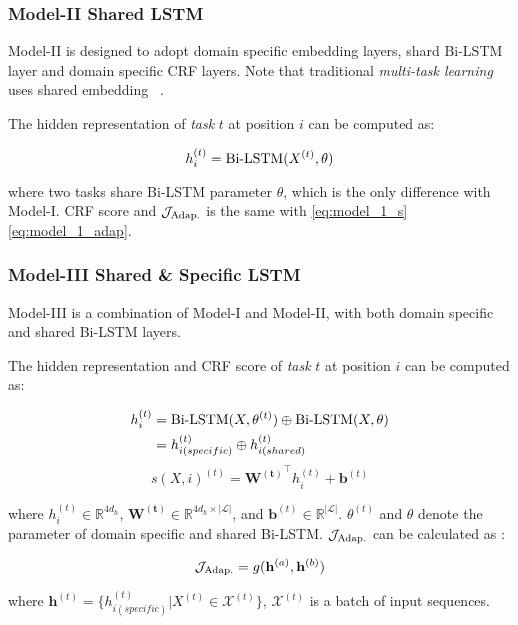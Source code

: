 \subsubsection{Model-\RN{2} Shared LSTM}

Model-\RN{2} is designed to adopt domain specific embedding layers, shard Bi-LSTM layer and domain specific CRF layers. Note that traditional \textit{multi-task learning} uses shared embedding ~\cite{DBLP:journals/corr/Ruder17a}.

The hidden representation of \textit{task} $t$ at position $i$ can be computed as:

\small
\begin{equation}\label{eq:model_2_h}
h_i^{(t)} = \textnormal{Bi-LSTM}(X^{(t)}, \theta)
\end{equation}
\normalsize

\noindent where two tasks share Bi-LSTM parameter $\theta$, which is the only difference with Model-\RN{1}. CRF score and $\mathcal{J}_{\textnormal{Adap.}}$ is the same with \eqref{eq:model_1_s}\eqref{eq:model_1_adap}.

\subsubsection{Model-\RN{3} Shared \& Specific LSTM}

Model-\RN{3} is a combination of Model-\RN{1} and Model-\RN{2}, with both domain specific and shared Bi-LSTM layers.

The hidden representation and CRF score of \textit{task} $t$ at position $i$ can be computed as:

\small
\begin{equation}
\begin{aligned}
h_i^{(t)} &= \textnormal{Bi-LSTM}(X, \theta^{(t)}) \oplus \textnormal{Bi-LSTM}(X, \theta)\\
&= h_{i(specific)}^{(t)} \oplus h_{i(shared)}^{(t)}
\end{aligned}
\end{equation}
\begin{equation}
s(X, i)^{(t)} = \mathbf{W^{(t)}}^\top h_i^{(t)} + \mathbf{b}^{(t)}
\end{equation}
\normalsize

\noindent where $h_i^{(t)} \in \mathbb{R}^{4d_h}$, $\mathbf{W^{(t)}} \in \mathbb{R}^{4d_h \times |\mathcal{L}|}$, and $\mathbf{b}^{(t)} \in \mathbb{R}^{|\mathcal{L}|}$. $\theta^{(t)}$ and $\theta$ denote the parameter of domain specific and shared Bi-LSTM. $\mathcal{J}_{\textnormal{Adap.}}$ can be calculated as :

\small
\begin{equation}
\mathcal{J}_{\textnormal{Adap.}} = g(\mathbf{h}^{(a)}, \mathbf{h}^{(b)})
\end{equation}
\normalsize

\noindent where $\mathbf{h}^{(t)} = \{h_{i(specific)}^{(t)} | X^{(t)} \in \mathcal{X}^{(t)}\}$, $\mathcal{X}^{(t)}$ is a batch of input sequences.

